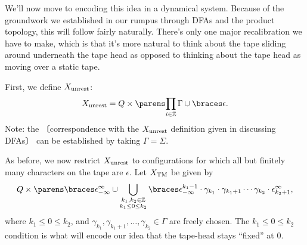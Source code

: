 \documentclass{fkpaper}
\newcommand{\np}[1]{\hspace{-.55em}〔#1〕\hspace{-.55em}}
\begin{document}
\begin{multicols}{2}
  We'll now move to encoding this idea in a dynamical system. Because of
  the groundwork we established in our rumpus through DFAs and the
  product topology, this will follow fairly naturally. There's only one
  major recalibration we have to make, which is that it's more natural
  to think about the tape sliding around underneath the tape head as
  opposed to thinking about the tape head as moving over a static tape.


  First, we define $X_{\rm unrest}$:
  \[
    X_{\rm unrest} = Q \times \pn{\prod_{i \in \ZZ} \Gamma \cup
      \set{\epsilon}}.
  \]
  Note: the \np{correspondence with the $X_{\rm unrest}$ definition
    given in discussing DFAs} can be established by taking $\Gamma =
  \Sigma$.

  As before, we now restrict $X_{\rm unrest}$ to configurations for
  which all but finitely many characters on the tape are $\epsilon$. Let
  $X_{\rm TM}$ be given by%
  \[
    Q \times \pn{\set{\epsilon_{-\infty}^{\infty}} \cup
      \bigcup_{\substack{k_1, k_2 \in \ZZ \\ k_1 \leq 0 \leq k_2}}
      \set{\epsilon_{-\infty}^{k_1-1}\cdot \gamma_{k_1} \cdot
        \gamma_{k_1 + 1} \cdots \gamma_{k_2} \cdot
        \epsilon_{k_2+1}^\infty}},
  \]
  where $k_1 \leq 0 \leq k_2$, and $\gamma_{k_1}, \gamma_{k_1 + 1},
  \ldots, \gamma_{k_2} \in \Gamma$ are freely chosen. The $k_1 \leq
  0\leq k_2$ condition is what will encode our idea that the tape-head
  stays ``fixed'' at $0$. %



\end{multicols}
\end{document}
